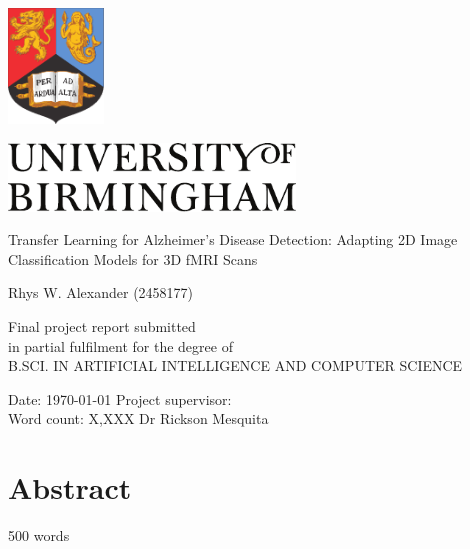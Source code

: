 \documentclass[12pt, a4paper]{article}
\begin{document}
\onehalfspacing


\begin{titlepage}

\begin{center}
\includegraphics[width=1in]{figures/bham_crest}

\vspace{0.3in}

\includegraphics[width=3in]{figures/bham_logo}

\vspace{2in}

{\LARGE Transfer Learning for Alzheimer’s Disease Detection: Adapting 2D Image Classification Models for 3D fMRI Scans }

\vspace{0.7in}

{\Large Rhys W. Alexander (2458177)}


\vfill{}
Final project report submitted\\ 
in partial fulfilment for the degree of\\
B.SCI. IN ARTIFICIAL INTELLIGENCE AND COMPUTER SCIENCE
\end{center}

\vspace{0.4in}
Date: \today{}     \hfill{} Project supervisor: \\
Word count: X,XXX   \hfill{} Dr Rickson Mesquita
\end{titlepage}






\tableofcontents

\newpage{}










\section{Abstract}
500 words
\end{document}
